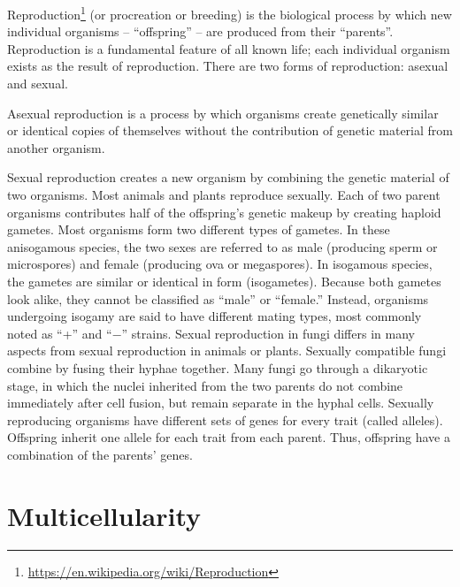 \documentclass[]{book}
\let\rmarkdownfootnote\footnote%
\def\footnote{\protect\rmarkdownfootnote}
\renewcommand{\href}[2]{#2\footnote{\url{#1}}}
\begin{document}
\href{https://en.wikipedia.org/wiki/Reproduction}{Reproduction} (or procreation or breeding) is the biological process by which new individual organisms -- ``offspring'' -- are produced from their ``parents''. Reproduction is a fundamental feature of all known life; each individual organism exists as the result of reproduction. There are two forms of reproduction: asexual and sexual.

Asexual reproduction is a process by which organisms create genetically similar or identical copies of themselves without the contribution of genetic material from another organism.

Sexual reproduction creates a new organism by combining the genetic material of two organisms. Most animals and plants reproduce sexually. Each of two parent organisms contributes half of the offspring's genetic makeup by creating haploid gametes. Most organisms form two different types of gametes. In these anisogamous species, the two sexes are referred to as male (producing sperm or microspores) and female (producing ova or megaspores). In isogamous species, the gametes are similar or identical in form (isogametes). Because both gametes look alike, they cannot be classified as ``male'' or ``female.'' Instead, organisms undergoing isogamy are said to have different mating types, most commonly noted as ``+'' and ``−'' strains. Sexual reproduction in fungi differs in many aspects from sexual reproduction in animals or plants. Sexually compatible fungi combine by fusing their hyphae together. Many fungi go through a dikaryotic stage, in which the nuclei inherited from the two parents do not combine immediately after cell fusion, but remain separate in the hyphal cells. Sexually reproducing organisms have different sets of genes for every trait (called alleles). Offspring inherit one allele for each trait from each parent. Thus, offspring have a combination of the parents' genes.

\hypertarget{multicellularity}{%
\section{Multicellularity}\label{multicellularity}}
\end{document}
